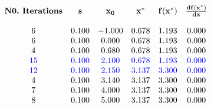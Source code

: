 \begin{equation}
\label{eq:resultsScalarGradSearch}
\begin{array}{cccccc}
\text{\bf N0.~Iterations}  & \mathbf{s}  & \mathbf{x_0}  &  \mathbf{x^\ast} &  \mathbf{f(x^\ast)}  & \mathbf{\frac{d f(x^\ast)}{dx}} \\
\\
6 & 0.100 & -1.000 & 0.678 & 1.193 & 0.000 \\
6 & 0.100 & 0.000 & 0.678 & 1.193 & 0.000 \\
4 & 0.100 & 0.680 & 0.678 & 1.193 & 0.000 \\
\color{blue} 15 & \color{blue} 0.100 & \color{blue} 2.100 & \color{blue} 0.678 & \color{blue} 1.193 & \color{blue} 0.000 \\
\color{blue} 12& \color{blue} 0.100 & \color{blue} 2.150 & \color{blue} 3.137 & \color{blue} 3.300 & \color{blue} 0.000 \\
4 & 0.100 & 3.140 & 3.137 & 3.300 & 0.000 \\
7 & 0.100 & 4.000 & 3.137 & 3.300 & 0.000 \\
8 & 0.100 & 5.000 & 3.137 & 3.300 & 0.000 \\
\end{array}
\end{equation}

\vspace*{.3cm}

